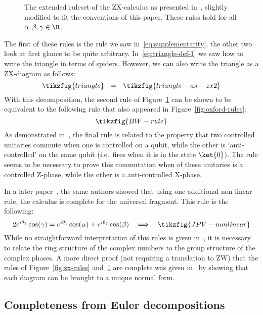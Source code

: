 \documentclass[a4paper,onecolumn,superscriptaddress,11pt,%
				unpublished,%
				allowfontchageintitle,%
				]{quantumarticle}
\begin{document}
\begin{figure}%
\centering
{}
\caption[Extended rules for ZX-calculus (Nancy)]{%
	The extended ruleset of the ZX-calculus as presented 
	in~\cite{SimonCompleteness}, slightly modified to fit the conventions of this paper.
	These rules hold for all $\alpha, \beta, \gamma\in \R$.
}
\label{fig:nancy-rules}
\end{figure}
The first of these rules is the rule we saw in~\eqref{eq:supplementarity}, the other two look at first glance to be quite arbitrary. In~\eqref{eq:triangle-def-1} we saw how to write the triangle in terms of spiders. However, we can also write the triangle as a ZX-diagram as follows:
\begin{equation}\label{eq:triangle-def-2}
	\tikzfig{triangle} \ \ = \ \ \tikzfig{triangle-as-zx2}
\end{equation}
With this decomposition, the second rule of Figure~\ref{fig:nancy-rules} can be shown to be equivalent to the following rule that also appeared in Figure~\ref{fig:oxford-rules}:
\begin{equation}
	\tikzfig{BW-rule}
\end{equation}
As demonstrated in~\cite{SimonCompleteness}, the final rule is related to the property that two controlled unitaries commute when one is controlled on a qubit, while the other is `anti-controlled' on the same qubit (i.e.~fires when it is in the state $\ket{0}$). The rule seems to be necessary to prove this commutation when of these unitaries is a controlled Z-phase, while the other is a anti-controlled X-phase.

In a later paper~\cite{JPV-universal}, the same authors showed that using one additional non-linear rule, the calculus is complete for the universal fragment. This rule is the following:
\begin{equation}
	2e^{i\theta_3}\cos(\gamma) = e^{i\theta_1}\cos(\alpha) + e^{i\theta_2}\cos(\beta)\ \  \implies \ \ \tikzfig{JPV-nonlinear}
\end{equation}
While no straightforward interpretation of this rules is given in~\cite{JPV-universal}, it is necessary to relate the ring structure of the complex numbers to the group structure of the complex phases.
A more direct proof (not requiring a translation to ZW) that the rules of Figure~\ref{fig:zx-rules} and~\ref{fig:nancy-rules} are complete was given in~\cite{ZXNormalForm} by showing that each diagram can be brought to a unique normal form.

\subsection{Completeness from Euler decompositions}\label{sec:euler}
\end{document}
